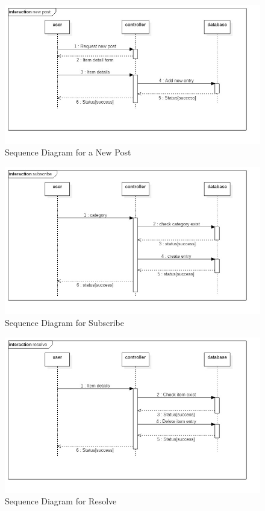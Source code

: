\documentclass[a4paper,12pt]{article}
\begin{document}
\begin{figure}[h!]
  \includegraphics[width=1\textwidth]{newpost}
  \caption{Sequence Diagram for a New Post}
\end{figure}
\begin{figure}[h!]
  \includegraphics[width=1\textwidth]{subscribe}
  \caption{Sequence Diagram for Subscribe}
\end{figure}
\begin{figure}[h!]
  \includegraphics[width=1\textwidth]{resolve}
  \caption{Sequence Diagram for Resolve}
\end{figure}
\end{document}
